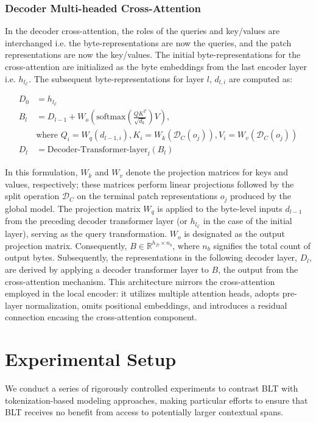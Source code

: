 \subsubsection{Decoder Multi-headed Cross-Attention} 

In the decoder cross-attention, the roles of the queries and key/values are interchanged i.e. the byte-representations are now the queries, and the patch representations are now the key/values. The initial byte-representations for the cross-attention are initialized as the byte embeddings from the last encoder layer i.e. $h_{l_{\mathcal{E}}}$. The subsequent byte-representations for layer $l$, $d_{l,i}$ are computed as:

\begin{align}
D_0 &= h_{l_{\mathcal{E}}} \\
B_l &= D_{l-1} + W_o\left(\text{softmax}\left(\frac{QK^T}{\sqrt{d_k}}\right)V\right), \\
  &\text{where } Q_i = W_q(d_{l-1,i}), K_i = W_k(\mathcal{D}_C(o_j)), V_i = W_v(\mathcal{D}_C(o_j)) \\
  D_l &= \text{Decoder-Transformer-layer}_l(B_l)
\end{align}

In this formulation, $W_k$ and $W_v$ denote the projection matrices for keys and values, respectively; these matrices perform linear projections followed by the split operation $\mathcal{D}_C$ on the terminal patch representations $o_j$ produced by the global model. The projection matrix $W_q$ is applied to the byte-level inputs $d_{l-1}$ from the preceding decoder transformer layer (or $h_{l_{\mathcal{E}}}$ in the case of the initial layer), serving as the query transformation. $W_o$ is designated as the output projection matrix. Consequently, $B \in \mathbb{R}^{h_{\mathcal{D}} \times n_b}$, where $n_b$ signifies the total count of output bytes. Subsequently, the representations in the following decoder layer, $D_l$, are derived by applying a decoder transformer layer to $B$, the output from the cross-attention mechanism. This architecture mirrors the cross-attention employed in the local encoder: it utilizes multiple attention heads, adopts pre-layer normalization, omits positional embeddings, and introduces a residual connection encasing the cross-attention component.

\section{Experimental Setup}
\label{section:experiments}
We conduct a series of rigorously controlled experiments to contrast {\textsc BLT} with tokenization-based modeling approaches, making particular efforts to ensure that {\textsc BLT} receives no benefit from access to potentially larger contextual spans.

